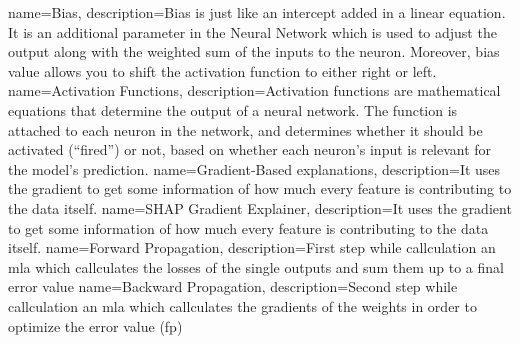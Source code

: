 {
 name=Bias,
 description={Bias is just like an intercept added in a linear equation. It is an additional parameter in the Neural Network which is used to adjust the output along with the weighted sum of the inputs to the neuron. Moreover, bias value allows you to shift the activation function to either right or left.
 }
}
{
 name=Activation Functions,
 description={Activation functions are mathematical equations that determine the output of a neural network. The function is attached to each neuron in the network, and determines whether it should be activated (“fired”) or not, based on whether each neuron's input is relevant for the model's prediction.
 }
}
{
	name=Gradient-Based explanations,
	description={It uses the gradient to get some information of how much every feature is contributing to the data itself.
	}
}
{
	name=SHAP Gradient Explainer,
	description={It uses the gradient to get some information of how much every feature is contributing to the data itself.
	}
}
{
	name=Forward Propagation,
	description={First step while callculation an \gls{mla} which callculates the losses of the single outputs and sum them up to a final error value
	}
}
{
	name=Backward Propagation,
	description={Second step while callculation an \gls{mla} which callculates the gradients of the weights in order to optimize the error value (\gls{fp})
	}
}